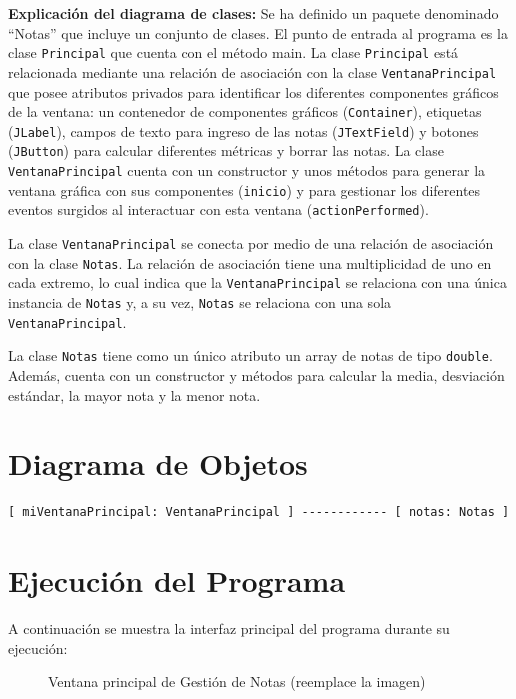 \documentclass[12pt,a4paper]{article}
\begin{document}
\textbf{Explicación del diagrama de clases:}
Se ha definido un paquete denominado ``Notas'' que incluye un conjunto de clases. El punto de entrada al programa es la clase \texttt{Principal} que cuenta con el método main. La clase \texttt{Principal} está relacionada mediante una relación de asociación con la clase \texttt{VentanaPrincipal} que posee atributos privados para identificar los diferentes componentes gráficos de la ventana: un contenedor de componentes gráficos (\texttt{Container}), etiquetas (\texttt{JLabel}), campos de texto para ingreso de las notas (\texttt{JTextField}) y botones (\texttt{JButton}) para calcular diferentes métricas y borrar las notas. La clase \texttt{VentanaPrincipal} cuenta con un constructor y unos métodos para generar la ventana gráfica con sus componentes (\texttt{inicio}) y para gestionar los diferentes eventos surgidos al interactuar con esta ventana (\texttt{actionPerformed}).

La clase \texttt{VentanaPrincipal} se conecta por medio de una relación de asociación con la clase \texttt{Notas}. La relación de asociación tiene una multiplicidad de uno en cada extremo, lo cual indica que la \texttt{VentanaPrincipal} se relaciona con una única instancia de \texttt{Notas} y, a su vez, \texttt{Notas} se relaciona con una sola \texttt{VentanaPrincipal}.

La clase \texttt{Notas} tiene como un único atributo un array de notas de tipo \texttt{double}. Además, cuenta con un constructor y métodos para calcular la media, desviación estándar, la mayor nota y la menor nota.

\section{Diagrama de Objetos}
\begin{verbatim}
[ miVentanaPrincipal: VentanaPrincipal ] ------------ [ notas: Notas ]
\end{verbatim}

\section{Ejecución del Programa}
A continuación se muestra la interfaz principal del programa durante su ejecución:

\begin{figure}[h]
    \centering
    \vspace{4cm} 
    \caption{Ventana principal de Gestión de Notas (reemplace la imagen)}
\end{figure}
\end{document}
